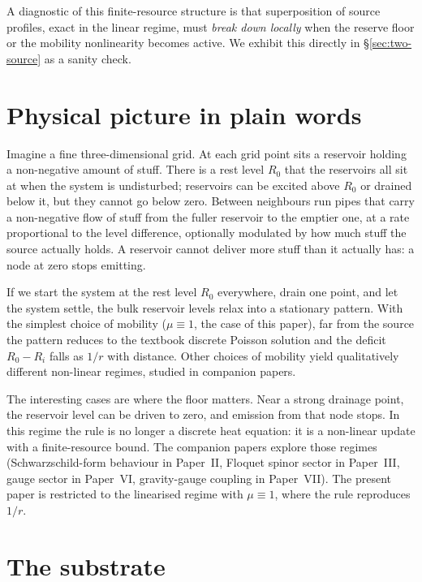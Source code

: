 \documentclass[11pt,a4paper]{article}
\begin{document}
A diagnostic of this finite-resource structure is that
superposition of source profiles, exact in the linear regime,
must \emph{break down locally} when the reserve floor or the
mobility nonlinearity becomes active. We exhibit this directly
in \S\ref{sec:two-source} as a sanity check.

\section{Physical picture in plain words}
\label{sec:picture}

Imagine a fine three-dimensional grid. At each grid point sits
a reservoir holding a non-negative amount of stuff. There is a
rest level $R_0$ that the reservoirs all sit at when the system
is undisturbed; reservoirs can be excited above $R_0$ or
drained below it, but they cannot go below zero. Between
neighbours run pipes that carry a non-negative flow of stuff
from the fuller reservoir to the emptier one, at a rate
proportional to the level difference, optionally modulated by
how much stuff the source actually holds. A reservoir cannot
deliver more stuff than it actually has: a node at zero stops
emitting.

If we start the system at the rest level $R_0$ everywhere,
drain one point, and let the system settle, the bulk reservoir
levels relax into a stationary pattern. With the simplest
choice of mobility ($\mu \equiv 1$, the case of this paper),
far from the source the pattern reduces to the textbook
discrete Poisson solution and the deficit $R_0 - R_i$ falls as
$1/r$ with distance. Other choices of mobility yield
qualitatively different non-linear regimes, studied in
companion papers.

The interesting cases are where the floor matters. Near a
strong drainage point, the reservoir level can be driven to
zero, and emission from that node stops. In this regime the
rule is no longer a discrete heat equation: it is a non-linear
update with a finite-resource bound. The companion papers
explore those regimes (Schwarzschild-form behaviour in
Paper~II, Floquet spinor sector in Paper~III, gauge sector in
Paper~VI, gravity-gauge coupling in Paper~VII). The present
paper is restricted to the linearised regime with
$\mu \equiv 1$, where the rule reproduces $1/r$.

\section{The substrate}
\label{sec:substrate}
\end{document}
